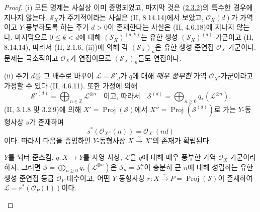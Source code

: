 \begin{proof}
(i) 모든 명제는 사실상 이미 증명되었고, 마지막 것은
(\hyperref[III.2.3.2-fr]{2.3.2})의 특수한 경우에 지나지 않는다.
$\mathcal S_X$가 주기적이라는 사실은 (II, 8.14.14)에서 보았고,
$\mathcal O_X(d)$가 가역이고 $Y$-풍부하도록 하는 주기 $d>0$이
존재한다는 사실은 (II, 4.6.18)에 지나지 않는다. 마지막으로
$0\leq k<d$에 대해 $(\mathcal S_X)^{(d,k)}$는 유한 생성
$(\mathcal S_X)^{(d)}$-가군이고 (II, 8.14.14), 따라서
(II, 2.1.6, (ii))에 의해 각 $(\mathcal S_X)_n$은 유한 생성 준연접
$\mathcal O_X$-가군이다. 문제는 국소적이고 $\mathcal O_X$가
연접이므로 $(\mathcal S_X)_n$들도 연접이다.

(ii) 주기 $d$를 그 배수로 바꾸어 $\mathcal L=\mathcal S'_d$가
$q$에 대해 \emph{매우 풍부한} 가역 $\mathcal O_X$-가군이라고 가정할
수 있다 (II, 4.6.11). 또한 가정에 의해
\[
\mathcal S'^{(d)}=\bigoplus_{n\in\mathbb Z}\mathcal L^{\otimes n}
\quad\text{이고, 따라서}\quad
\mathcal S^{(d)}=\bigoplus_{n\geq0}q_*(\mathcal L^{\otimes n}).
\]
(II, 3.1.8 및 3.2.9)에 의해
$X'=\operatorname{Proj}(\mathcal S)$에서
$X''=\operatorname{Proj}(\mathcal S^{(d)})$로 가는 $Y$-동형사상 $s$가
존재하며
\[
s^*(\mathcal O_{X''}(n))=\mathcal O_{X'}(nd)
\]
이다. 따라서 다음을 증명하면 $Y$-동형사상
$X\xrightarrow{\sim}X'$의 존재가 확립된다.

\begin{env}[2.3.4.1]
\label{III.2.3.4.1-fr}
$Y$를 뇌터 준스킴, $q:X\to Y$를 사영 사상,
$\mathcal L$을 $q$에 대해 매우 풍부한 가역 $\mathcal O_X$-가군이라
하자. 그러면
$\mathcal S=\bigoplus_{n\geq0}q_*(\mathcal L^{\otimes n})$은
$\mathcal S_n=\mathcal S_1^n$이 충분히 큰 $n$에 대해 성립하는 유한
생성 준연접 등급 $\mathcal O_Y$-대수이고, 어떤 $Y$-동형사상
$r:X\xrightarrow{\sim}P=\operatorname{Proj}(\mathcal S)$이 존재하여
$\mathcal L=r^*(\mathcal O_P(1))$이다.
\end{env}


\end{proof}
